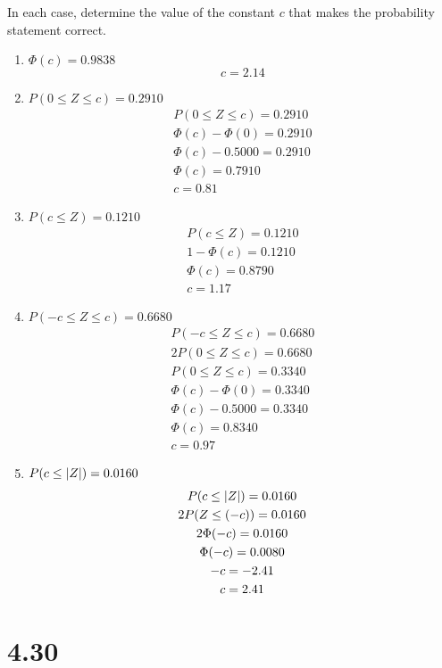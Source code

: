 \documentclass[letterpaper,12pt,fleqn]{article}
\renewcommand{\O}{\Phi}
\begin{document}
In each case, determine the value of the constant \(c\) that makes the probability statement correct.
\begin{enumerate}[label={\alph*)}]
\item \(\O(c)=0.9838\)
  \[c=2.14\]
\item \(P(0\le Z\le c)=0.2910\)
  \begin{gather*}
    P(0\le Z\le c)=0.2910 \\
    \O(c)-\O(0)=0.2910 \\
    \O(c)-0.5000=0.2910 \\
    \O(c)=0.7910 \\
    c=0.81
  \end{gather*}
\item \(P(c\le Z)=0.1210\)
  \begin{gather*}
    P(c\le Z)=0.1210 \\
    1-\O(c)=0.1210 \\
    \O(c)=0.8790 \\
    c=1.17
  \end{gather*}
\item \(P(-c\le Z\le c)=0.6680\)
  \begin{gather*}
    P(-c\le Z\le c)=0.6680 \\
    2P(0\le Z\le c)=0.6680 \\
    P(0\le Z\le c)=0.3340 \\
    \O(c)-\O(0)=0.3340 \\
    \O(c)-0.5000=0.3340 \\
    \O(c)=0.8340 \\
    c=0.97
  \end{gather*}
\item \(P(c\le\lvert Z\rvert)=0.0160\)
  \begin{gather*}
    P(c\le\abs{Z})=0.0160 \\
    2P(Z\le(-c))=0.0160 \\
    2\O(-c)=0.0160 \\
    \O(-c)=0.0080 \\
    -c=-2.41 \\
    c=2.41
  \end{gather*}
\end{enumerate}

\section*{4.30}
\end{document}
